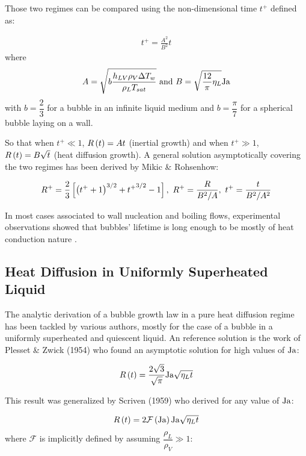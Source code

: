 Those two regimes can be compared using the non-dimensional time $t^{+}$ defined as:

\begin{align}
t^{+} = \frac{A^{2}}{B^{2}}t
\end{align}
where
\begin{equation}
A=\sqrt{b \frac{h_{LV}\rho_{V} \Delta T_{w} }{\rho_{L}T_{sat}} } \ \text{and}\ B=\sqrt{\frac{12}{\pi}\eta_{L}}\Ja
\end{equation}
with $b=\dfrac{2}{3}$ for a bubble in an infinite liquid medium and $b=\dfrac{\pi}{7}$ for a spherical bubble laying on a wall.

\npar

So that when $t^{+} \ll 1$, $R\left( t \right) = At$ (inertial growth) and when $t^{+} \gg 1$, $R\left( t \right)=B\sqrt{t}$ (heat diffusion growth). A general solution asymptotically covering the two regimes has been derived by Mikic \& Rohsenhow:

\begin{equation}
R^{+} = \frac{2}{3}\crocht{\parth{t^{+}+1}^{3/2}+{t^{+}}^{3/2}-1},\ R^{+}=\frac{R}{B^{2}/A},\ t^{+}=\frac{t}{B^{2}/A^{2}}
\end{equation}


In most cases associated to wall nucleation and boiling flows, experimental observations showed that bubbles' lifetime is long enough to be mostly of heat conduction nature \cite{kossolapov_experimental_2021, maity_effect_2000, zhou_experimental_2020}.

\subsection{Heat Diffusion in Uniformly Superheated Liquid}

The analytic derivation of a bubble growth law in a pure heat diffusion regime has been tackled by various authors, mostly for the case of a bubble in a uniformly superheated and quiescent liquid. An reference solution is the work of Plesset \& Zwick (1954) \cite{plesset_growth_1954} who found an asymptotic solution for high values of $\mathrm{Ja}$:

\begin{equation}
R\left( t \right) = \frac{2\sqrt{3}}{\sqrt{\pi}}\mathrm{Ja}\sqrt{\eta_{L}t}
\label{eq:growth_plesset}
\end{equation}

This result was generalized by Scriven (1959) \cite{scriven_dynamics_1959} who derived for any value of $\mathrm{Ja}$:

\begin{equation}
R\left( t \right) = 2 \mathcal{F}\left( \mathrm{Ja} \right)\mathrm{Ja}\sqrt{\eta_{L}t}
\label{eq:growth_scriven}
\end{equation} 
where $\mathcal{F}$ is implicitly defined by assuming $\dfrac{\rho_{L}}{\rho_{V}} \gg 1$:

